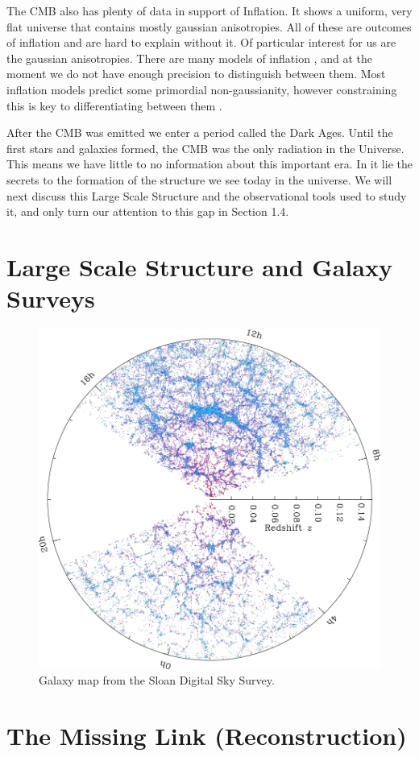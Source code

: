 The CMB also has plenty of data in support of Inflation. It shows a uniform, very flat universe that contains mostly gaussian anisotropies. All of these are outcomes of inflation and are hard to explain without it. Of particular interest for us are the gaussian anisotropies. There are many models of inflation , and at the moment we do not have enough precision to distinguish between them. Most inflation models predict some primordial non-gaussianity, however constraining this is key to differentiating between them .

After the CMB was emitted we enter a period called the Dark Ages. Until the first stars and galaxies formed, the CMB was the only radiation in the Universe. This means we have little to no information about this important era. In it lie the secrets to the formation of the structure we see today in the universe. We will next discuss this Large Scale Structure and the observational tools used to study it, and only turn our attention to this gap in Section 1.4.

\section{Large Scale Structure and Galaxy Surveys}



\begin{figure}
    \centering
    \includegraphics[width=0.9\columnwidth]{images/misc/orangepie.jpg}%
    
    \caption{
    Galaxy map from the Sloan Digital Sky Survey.
    }
    
    \label{fig:2}
\end{figure}


\section{The Missing Link (Reconstruction)}


